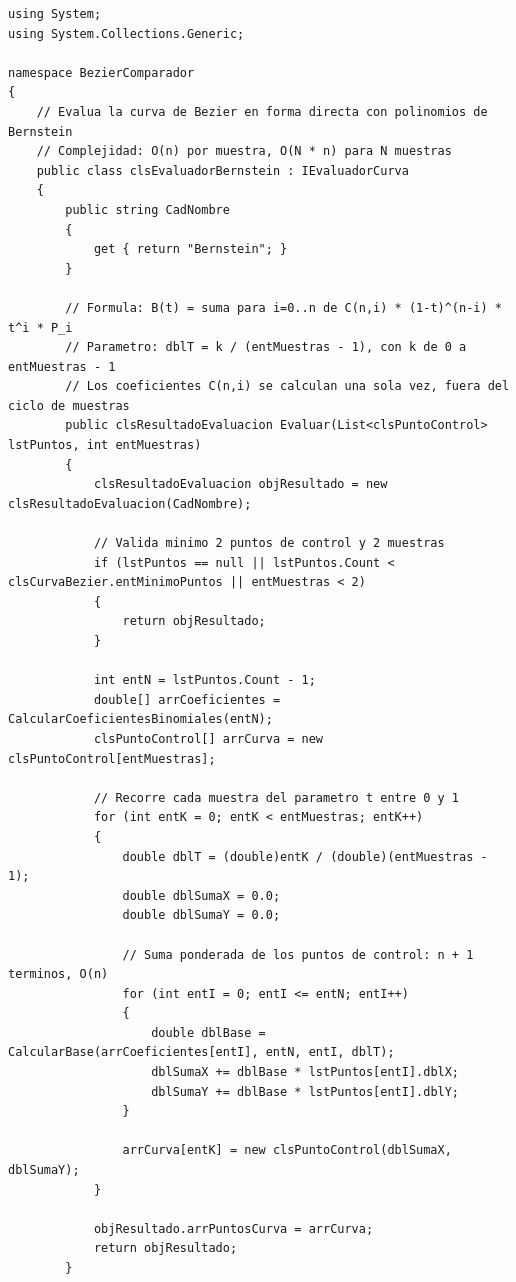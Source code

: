 \begin{lstlisting}[language={[Sharp]C}, caption={Clase clsEvaluadorBernstein (evaluacion con polinomios de Bernstein).}, label={lst:anx_bernstein}]
using System;
using System.Collections.Generic;

namespace BezierComparador
{
    // Evalua la curva de Bezier en forma directa con polinomios de Bernstein
    // Complejidad: O(n) por muestra, O(N * n) para N muestras
    public class clsEvaluadorBernstein : IEvaluadorCurva
    {
        public string CadNombre
        {
            get { return "Bernstein"; }
        }

        // Formula: B(t) = suma para i=0..n de C(n,i) * (1-t)^(n-i) * t^i * P_i
        // Parametro: dblT = k / (entMuestras - 1), con k de 0 a entMuestras - 1
        // Los coeficientes C(n,i) se calculan una sola vez, fuera del ciclo de muestras
        public clsResultadoEvaluacion Evaluar(List<clsPuntoControl> lstPuntos, int entMuestras)
        {
            clsResultadoEvaluacion objResultado = new clsResultadoEvaluacion(CadNombre);

            // Valida minimo 2 puntos de control y 2 muestras
            if (lstPuntos == null || lstPuntos.Count < clsCurvaBezier.entMinimoPuntos || entMuestras < 2)
            {
                return objResultado;
            }

            int entN = lstPuntos.Count - 1;
            double[] arrCoeficientes = CalcularCoeficientesBinomiales(entN);
            clsPuntoControl[] arrCurva = new clsPuntoControl[entMuestras];

            // Recorre cada muestra del parametro t entre 0 y 1
            for (int entK = 0; entK < entMuestras; entK++)
            {
                double dblT = (double)entK / (double)(entMuestras - 1);
                double dblSumaX = 0.0;
                double dblSumaY = 0.0;

                // Suma ponderada de los puntos de control: n + 1 terminos, O(n)
                for (int entI = 0; entI <= entN; entI++)
                {
                    double dblBase = CalcularBase(arrCoeficientes[entI], entN, entI, dblT);
                    dblSumaX += dblBase * lstPuntos[entI].dblX;
                    dblSumaY += dblBase * lstPuntos[entI].dblY;
                }

                arrCurva[entK] = new clsPuntoControl(dblSumaX, dblSumaY);
            }

            objResultado.arrPuntosCurva = arrCurva;
            return objResultado;
        }


\end{lstlisting}
